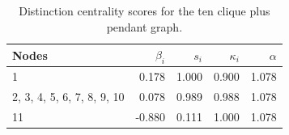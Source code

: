 \begin{table}
\centering
\caption{\label{tab:cten}Distinction centrality scores for the ten clique plus pendant graph.}
\centering
\begin{tabular}[t]{lrrrr}
\toprule
Nodes & $\beta_i$ & $s_i$ & $\kappa_i$ & $\alpha$\\
\midrule
1 & 0.178 & 1.000 & 0.900 & 1.078\\
2, 3, 4, 5, 6, 7, 8, 9, 10 & 0.078 & 0.989 & 0.988 & 1.078\\
11 & -0.880 & 0.111 & 1.000 & 1.078\\
\bottomrule
\end{tabular}
\end{table}
